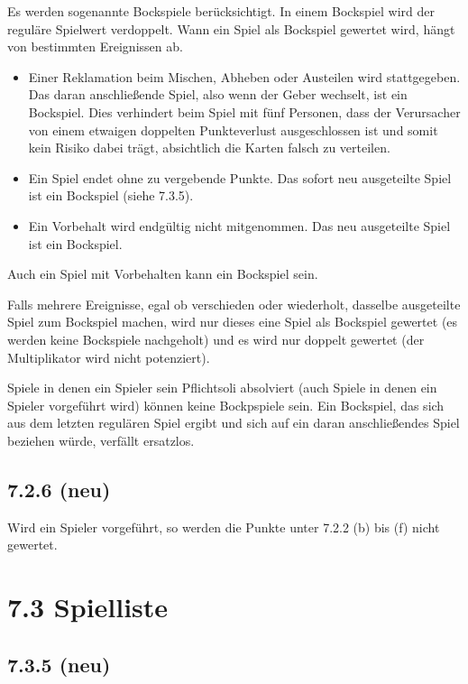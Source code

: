 Es werden sogenannte Bockspiele berücksichtigt. In einem Bockspiel wird
der reguläre Spielwert verdoppelt. Wann ein Spiel als Bockspiel
gewertet wird, hängt von bestimmten Ereignissen ab.

\begin{itemize}
    \item Einer Reklamation beim Mischen, Abheben oder Austeilen wird
        stattgegeben. Das daran anschließende Spiel, also wenn der Geber
        wechselt, ist ein Bockspiel. Dies verhindert beim Spiel mit fünf
        Personen, dass der Verursacher von einem etwaigen doppelten
        Punkteverlust ausgeschlossen ist und somit kein Risiko dabei
        trägt, absichtlich die Karten falsch zu verteilen.
    \item Ein Spiel endet ohne zu vergebende Punkte. Das sofort neu
        ausgeteilte Spiel ist ein Bockspiel (siehe 7.3.5).
    \item Ein Vorbehalt  wird endgültig nicht mitgenommen. Das
        neu ausgeteilte Spiel ist ein Bockspiel.
\end{itemize}

Auch ein Spiel mit Vorbehalten kann ein Bockspiel sein.

Falls mehrere Ereignisse, egal ob verschieden oder wiederholt, dasselbe
ausgeteilte Spiel zum Bockspiel machen, wird nur dieses eine Spiel als
Bockspiel gewertet (es werden keine Bockspiele nachgeholt) und es wird
nur doppelt gewertet (der Multiplikator wird nicht potenziert).

Spiele in denen ein Spieler sein Pflichtsoli absolviert (auch Spiele in denen
ein Spieler vorgeführt wird) können keine Bockpspiele sein. Ein Bockspiel, das
sich aus dem letzten regulären Spiel ergibt und sich auf ein daran
anschließendes Spiel beziehen würde, verfällt ersatzlos.

\subsection*{7.2.6 (neu)}

Wird ein Spieler vorgeführt, so werden die Punkte unter 7.2.2 (b) bis
(f) nicht gewertet.

\section*{7.3 Spielliste}

\subsection*{7.3.5 (neu)}

